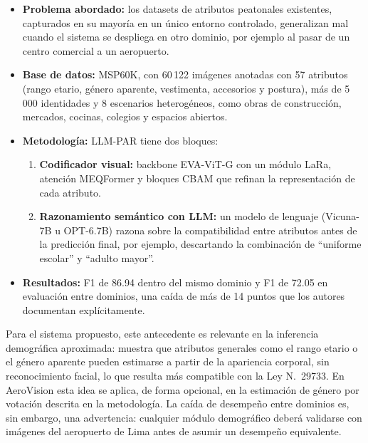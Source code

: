 \documentclass[12pt,letterpaper]{article}
\begin{document}
\begin{itemize}
    \item \textbf{Problema abordado:} los datasets de atributos
    peatonales existentes, capturados en su mayoría en un único entorno
    controlado, generalizan mal cuando el sistema se despliega en otro
    dominio, por ejemplo al pasar de un centro comercial a un aeropuerto.

    \item \textbf{Base de datos:} MSP60K, con 60\,122 imágenes anotadas
    con 57 atributos (rango etario, género aparente, vestimenta,
    accesorios y postura), más de 5\,000 identidades y 8 escenarios
    heterogéneos, como obras de construcción, mercados, cocinas, colegios
    y espacios abiertos.

    \item \textbf{Metodología:} LLM-PAR tiene dos bloques:
    \begin{enumerate}
        \item \textbf{Codificador visual:} backbone EVA-ViT-G con un
        módulo LaRa, atención MEQFormer y bloques CBAM que refinan la
        representación de cada atributo.
        \item \textbf{Razonamiento semántico con LLM:} un modelo de
        lenguaje (Vicuna-7B u OPT-6.7B) razona sobre la compatibilidad
        entre atributos antes de la predicción final, por ejemplo,
        descartando la combinación de ``uniforme escolar'' y ``adulto
        mayor''.
    \end{enumerate}

    \item \textbf{Resultados:} F1 de 86.94 dentro del mismo dominio y
    F1 de 72.05 en evaluación entre dominios, una caída de más de 14
    puntos que los autores documentan explícitamente.
\end{itemize}

Para el sistema propuesto, este antecedente es relevante en la inferencia
demográfica aproximada: muestra que atributos generales como el rango
etario o el género aparente pueden estimarse a partir de la apariencia
corporal, sin reconocimiento facial, lo que resulta más compatible con la
Ley N.\textdegree~29733. En AeroVision esta idea se aplica, de forma
opcional, en la estimación de género por votación descrita en la
metodología. La caída de desempeño entre dominios es, sin embargo, una
advertencia: cualquier módulo demográfico deberá validarse con imágenes
del aeropuerto de Lima antes de asumir un desempeño equivalente.
\end{document}
